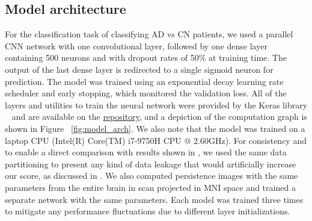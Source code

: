 \documentclass{article}
\begin{document}
\subsection{Model architecture}\label{sec:model_arch}
For the classification task of classifying AD vs CN patients, we used a parallel CNN network with
one convolutional layer, followed by one dense layer containing 500 neurons and with dropout rates
of 50\% at training time. The output of the last dense layer is redirected to a single sigmoid
neuron for prediction. The model was trained using an exponential decay learning rate scheduler and
early stopping, which monitored the validation loss. All of the layers and utilities to train the
neural network were provided by the Keras library ~\citep{chollet2015keras} and are available on the
\href{https://github.com/BorgwardtLab/ADNI_MRI_Analysis}{repository}, and a depiction of the computation
graph is shown in Figure ~\ref{fig:model_arch}. We also note that the model was trained on a laptop
CPU (Intel(R) Core(TM) i7-9750H CPU @ 2.60GHz). For consistency and to enable a direct comparison
with results shown in \citep{bruningk2020image}, we used the same data partitioning to present any
kind of data leakage that would artificially increase our score, as discussed in
\citet{wen2020convolutional}. We also computed persistence images with the same parameters from the
entire brain in scan projected in MNI space and trained a separate network with the same parameters.
Each model was trained three times to mitigate any performance fluctuations due to different layer
initializations.
\end{document}
